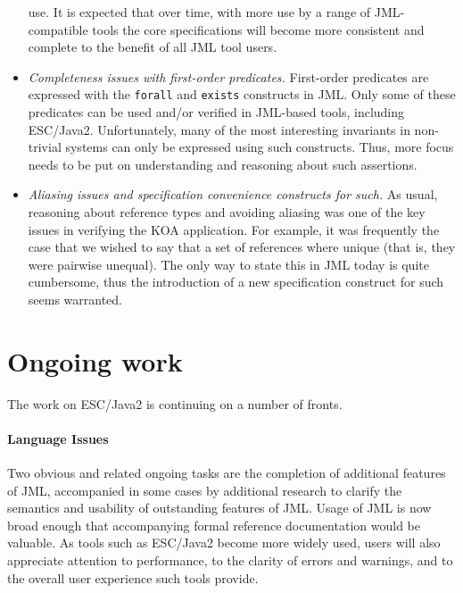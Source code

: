 \documentclass{llncs}
\begin{document}
\begin{itemize}
  use.  It is expected that over time, with more use by a range of
  JML-compatible tools the core specifications will become more
  consistent and complete to the benefit of all JML tool users.
\item \emph{Completeness issues with first-order predicates.}
  First-order predicates are expressed with the \texttt{forall} and
  \texttt{exists} constructs in JML.  Only some of these predicates
  can be used and/or verified in JML-based tools, including ESC/Java2.
  Unfortunately, many of the most interesting invariants in
  non-trivial systems can only be expressed using such constructs.
  Thus, more focus needs to be put on understanding and reasoning
  about such assertions.
\item \emph{Aliasing issues and specification convenience constructs
    for such.}  As usual, reasoning about reference types and avoiding
  aliasing was one of the key issues in verifying the KOA application.
  For example, it was frequently the case that we wished to say that a
  set of references where unique (that is, they were pairwise
  unequal).  The only way to state this in JML today is quite
  cumbersome, thus the introduction of a new specification construct
  for such seems warranted.
\end{itemize}


\section{Ongoing work}
The work on ESC/Java2 is continuing on a number of fronts.

\paragraph*{Language Issues} Two obvious and related ongoing tasks are
the completion of additional features of JML, accompanied in some
cases by additional research to clarify the semantics and usability of
outstanding features of JML.  Usage of JML is now broad enough that
accompanying formal reference documentation would be valuable.  As
tools such as ESC/Java2 become more widely used, users will also
appreciate attention to performance, to the clarity of errors and
warnings, and to the overall user experience such tools provide.
\end{document}
